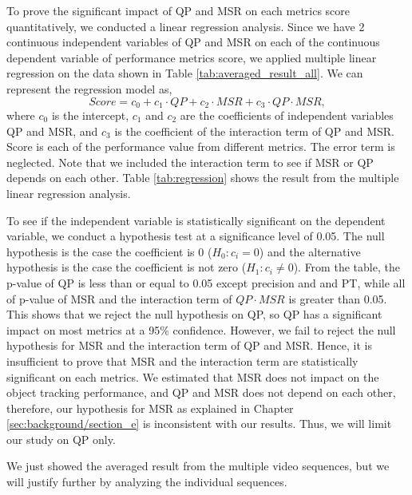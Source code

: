 
To prove the significant impact of QP and MSR on each metrics score quantitatively, we conducted a linear regression analysis. Since we have 2 continuous independent variables of QP and MSR on each of the continuous dependent variable of performance metrics score, we applied multiple linear regression on the data shown in Table \ref{tab:averaged_result_all}. We can represent the regression model as,
\begin{equation}
Score = \mathit{c_0} + \mathit{c_1} \cdot QP + \mathit{c_2} \cdot MSR + \mathit{c_3} \cdot QP \cdot MSR,
\end{equation}
where $\mathit{c_0}$ is the intercept, $\mathit{c_1}$ and $\mathit{c_2}$ are the coefficients of independent variables QP and MSR, and $\mathit{c_3}$ is the coefficient of the interaction term of QP and MSR. Score is each of the performance value from different metrics. The error term is neglected. Note that we included the interaction term to see if MSR or QP depends on each other. Table \ref{tab:regression} shows the result from the multiple linear regression analysis.

To see if the independent variable is statistically significant on the dependent variable, we conduct a hypothesis test at a significance level of 0.05. The null hypothesis is the case the coefficient is 0 ($H_0: c_i = 0$) and the alternative hypothesis is the case the coefficient is not zero ($H_1: c_i \neq 0$). From the table, the p-value of QP is less than or equal to 0.05 except precision and and PT, while all of p-value of MSR and the interaction term of $QP \cdot MSR$ is greater than 0.05. This shows that we reject the null hypothesis on QP, so QP has a significant impact on most metrics at a 95\% confidence. However, we fail to reject the null hypothesis for MSR and the interaction term of QP and MSR. Hence, it is insufficient to prove that MSR and the interaction term are statistically significant on each metrics. We estimated that MSR does not impact on the object tracking performance, and QP and MSR does not depend on each other, therefore, our hypothesis for MSR as explained in Chapter \ref{sec:background/section_e} is inconsistent with our results. Thus, we will limit our study on QP only.

We just showed the averaged result from the multiple video sequences, but we will justify further by analyzing the individual sequences.

